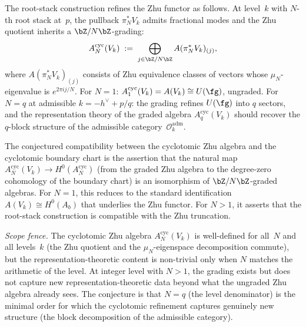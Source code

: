 The root-stack construction refines the
Zhu functor as follows.
At level~$k$ with $N$-th root stack at~$p$,
the pullback $\pi_N^* V_k$ admits fractional
modes and the Zhu quotient inherits a
$\bZ/N\bZ$-grading:
\[
A^{\mathrm{cyc}}_N(V_k)
\;:=\;
\bigoplus_{j \in \bZ/N\bZ}
A(\pi_N^* V_k)_{(j)},
\]
where $A(\pi_N^* V_k)_{(j)}$ consists of
Zhu equivalence classes of vectors whose
$\mu_N$-eigenvalue is $e^{2\pi i j/N}$.
For $N = 1$: $A^{\mathrm{cyc}}_1(V_k) = A(V_k)
\cong U(\fg)$, ungraded. For $N = q$ at
admissible $k = -h^\vee + p/q$: the grading
refines $U(\fg)$ into $q$ sectors, and the
representation theory of the graded algebra
$A^{\mathrm{cyc}}_q(V_k)$ should recover the
$q$-block structure of the admissible
category~$\mathcal{O}_k^{\mathrm{adm}}$.

The conjectured compatibility between the
cyclotomic Zhu algebra and the cyclotomic
boundary chart is the assertion that the natural map
$A^{\mathrm{cyc}}_N(V_k)
\to H^0(A^{\mathrm{cyc}}_N)$
(from the graded Zhu algebra to the degree-zero
cohomology of the boundary chart) is an
isomorphism of $\bZ/N\bZ$-graded algebras.
For $N = 1$, this reduces to the standard
identification $A(V_k) \cong H^0(A_b)$ that
underlies the Zhu functor.
For $N > 1$, it asserts that the root-stack
construction is compatible with the Zhu
truncation.

\emph{Scope fence.}
The cyclotomic Zhu algebra $A^{\mathrm{cyc}}_N(V_k)$
is well-defined for all~$N$ and all levels~$k$
(the Zhu quotient and the $\mu_N$-eigenspace
decomposition commute), but the representation-theoretic
content is non-trivial only when $N$ matches the
arithmetic of the level. At integer level with
$N > 1$, the grading exists but does not
capture new representation-theoretic data beyond
what the ungraded Zhu algebra already sees.
The conjecture is that $N = q$ (the level
denominator) is the minimal order for which
the cyclotomic refinement captures genuinely new
structure (the block decomposition of the
admissible category).

